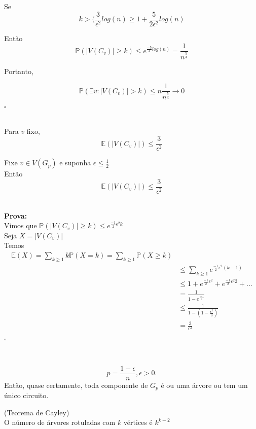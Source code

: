 Se \[k > (\frac{3}{\epsilon^{2}}log(n) \geq 1 + \frac{5}{2\epsilon^{2}} log(n) \] 
 
Então \[\mathbb{P}(|V(C_{v})| \geq k) \leq e^{\frac{-5}{4}log(n)} = \frac{1}{n^{\frac{5}{4}}}\]

Portanto,

\[\mathbb{P}(\exists v: |V(C_{v})|>k) \leq n \frac{1}{n^{\frac{5}{4}}} \rightarrow 0 \]

\begin{flushright}
$\square$
\end{flushright}\\

Para $v$ fixo, \[\mathbb{E}(|V(C_{v})|) \leq \frac{3}{\epsilon^{2}} \]

\begin{teorema}
Fixe $v\in V(G_{p})$ e suponha $\epsilon \leq \frac{1}{2}$ \\
Então
\[\mathbb{E}(|V(C_{v})|) \leq \frac{3}{\epsilon^{2}} \]
\end{teorema}\\
\textbf{Prova:} \\
Vimos que $\mathbb{P}(|V(C_{v})|\geq k) \leq e^{\frac{-1}{2}\epsilon^{2}k}$
\\
Seja $X = |V(C_{v})|$
\\
Temos
\begin{align*}
	\mathbb{E}(X) = \sum_{k \geq 1} k\mathbb{P}(X=k) = \sum_{k \geq 1} \mathbb{P}(X \geq k) \\
	&\leq \sum_{k \geq 1} e^{\frac{-1}{2}\epsilon^2(k-1)} \\
	&\leq  1 + e^{\frac{-1}{2}\epsilon^2} + e^{\frac{-1}{2}\epsilon^2 2} + ... \\
	&= \frac{1}{1-e^{\frac{-\epsilon^{2}}{2}}} \\
	&\leq \frac{1}{1-(1-\frac{\epsilon^{2}}{3})} \\
	& = \frac{3}{\epsilon^2}
\end{align*}

\begin{flushright}
$\square$
\end{flushright}\\

\begin{teorema}
\[p = \frac{1-\epsilon}{n}, \epsilon > 0.\] Então, quase certamente, toda componente de $G_{p}$ é ou uma árvore ou tem um único circuito.
\end{teorema}

\begin{lema}
(Teorema de Cayley)\\
O número de árvores rotuladas com $k$ vértices é $k^{k-2}$
\end{lema}\\

